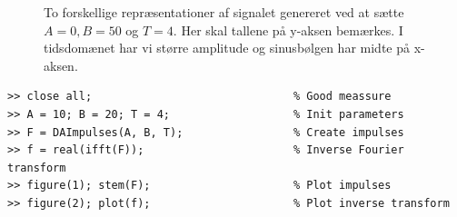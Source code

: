 \documentclass[a4paper, 10pt, danish, final]{article}
\begin{document}
\begin{figure}[!h]
    \centering
    \caption[]{To forskellige repræsentationer af signalet genereret ved
    at sætte $A = 0, B = 50$ og $T = 4$. Her skal tallene på y-aksen
    bemærkes. I tidsdomænet har vi større amplitude og sinusbølgen har
    midte på x-aksen.}
    \label{signal_0_50_4}
\end{figure}

\begin{lstlisting}[caption={Invers Fouriertransformation i MATLAB og
    plot af signaler
    (kommandoprompt)}, captionpos=b,
    label={ifft_matlab}, float=t]
>> close all;                               % Good meassure
>> A = 10; B = 20; T = 4;                   % Init parameters
>> F = DAImpulses(A, B, T);                 % Create impulses
>> f = real(ifft(F));                       % Inverse Fourier transform
>> figure(1); stem(F);                      % Plot impulses
>> figure(2); plot(f);                      % Plot inverse transform

\end{lstlisting}





\end{document}
